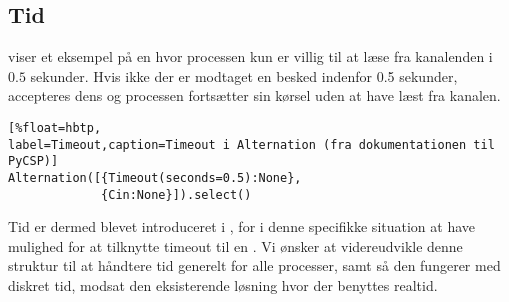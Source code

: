 
\subsection{Tid} \label{sec:tid}
 viser et eksempel på en  hvor processen kun er villig
til at læse fra kanalenden  i $0.5$ sekunder. Hvis ikke der
er modtaget en besked indenfor 0.5 sekunder, accepteres dens 
og processen fortsætter sin kørsel uden at have læst fra kanalen.

\begin{lstlisting}[%float=hbtp, 
label=Timeout,caption=Timeout i Alternation (fra dokumentationen til PyCSP)]
Alternation([{Timeout(seconds=0.5):None}, 
             {Cin:None}]).select()
\end{lstlisting}

Tid er dermed blevet introduceret i \pycsp, for i denne specifikke situation at  have
mulighed for at tilknytte timeout til en . Vi ønsker
at videreudvikle denne struktur til at håndtere tid generelt for alle
processer, samt så den fungerer med diskret tid, modsat den eksisterende
løsning hvor der benyttes realtid.

